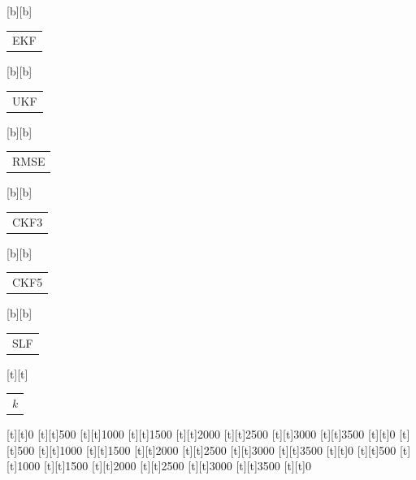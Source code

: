 %    
%
%
\begin{psfrags}%
\psfragscanon%
%
[b][b]{\color[rgb]{0,0,0}\setlength{\tabcolsep}{0pt}\begin{tabular}{c}EKF\end{tabular}}%
[b][b]{\color[rgb]{0,0,0}\setlength{\tabcolsep}{0pt}\begin{tabular}{c}UKF\end{tabular}}%
[b][b]{\color[rgb]{0,0,0}\setlength{\tabcolsep}{0pt}\begin{tabular}{c}RMSE\end{tabular}}%
[b][b]{\color[rgb]{0,0,0}\setlength{\tabcolsep}{0pt}\begin{tabular}{c}CKF3\end{tabular}}%
[b][b]{\color[rgb]{0,0,0}\setlength{\tabcolsep}{0pt}\begin{tabular}{c}CKF5\end{tabular}}%
[b][b]{\color[rgb]{0,0,0}\setlength{\tabcolsep}{0pt}\begin{tabular}{c}SLF\end{tabular}}%
[t][t]{\color[rgb]{0,0,0}\setlength{\tabcolsep}{0pt}\begin{tabular}{c}$k$\end{tabular}}%
%
[t][t]{0}%
[t][t]{500}%
[t][t]{1000}%
[t][t]{1500}%
[t][t]{2000}%
[t][t]{2500}%
[t][t]{3000}%
[t][t]{3500}%
[t][t]{0}%
[t][t]{500}%
[t][t]{1000}%
[t][t]{1500}%
[t][t]{2000}%
[t][t]{2500}%
[t][t]{3000}%
[t][t]{3500}%
[t][t]{0}%
[t][t]{500}%
[t][t]{1000}%
[t][t]{1500}%
[t][t]{2000}%
[t][t]{2500}%
[t][t]{3000}%
[t][t]{3500}%
[t][t]{0}%

\end{psfrags}
